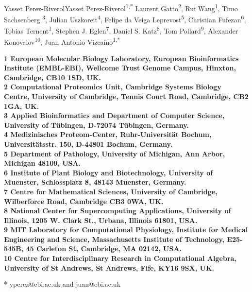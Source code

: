 \documentclass[10pt,letterpaper]{article}
\date{}
\begin{document}
\vspace*{0.35in}

\begin{flushleft}
{\Large
\textbf{}
}
\newline
\\

Yasset Perez-RiverolYasset Perez-Riverol\textsuperscript{1,*}
Laurent Gatto\textsuperscript{2},
Rui Wang\textsuperscript{1}, 
Timo Sachsenberg \textsuperscript{3},
Julian Uszkoreit\textsuperscript{4},
Felipe da Veiga Leprevost\textsuperscript{5},
Christian Fufezan\textsuperscript{6},
Tobias Ternent\textsuperscript{1},
Stephen J. Eglen\textsuperscript{7}, 
Daniel S. Katz\textsuperscript{8}, 
Tom Pollard\textsuperscript{9}, 
Alexander Konovalov\textsuperscript{10},
Juan Antonio Vizcaíno\textsuperscript{1,*}


\bigskip

\bf{1} European Molecular Biology Laboratory, European Bioinformatics
Institute (EMBL-EBI), Wellcome Trust Genome Campus, Hinxton,
Cambridge, CB10 1SD, UK.
\\
\bf{2} Computational Proteomics Unit, Cambridge Systems Biology
Centre, University of Cambridge, Tennis Court Road, Cambridge, CB2
1GA, UK.
\\
\bf{3} Applied Bioinformatics and Department of Computer Science,
University of Tübingen, D-72074 Tübingen, Germany.
\\
\bf{4} Medizinisches Proteom-Center, Ruhr-Universität Bochum,
Universitätsstr. 150, D-44801 Bochum, Germany.
\\
\bf{5} Department of Pathology, University of Michigan, Ann Arbor,
Michigan 48109, USA.
\\
\bf{6} Institute of Plant Biology and Biotechnology, University of
Muenster, Schlossplatz 8, 48143 Muenster, Germany.
\\
\bf{7} Centre for Mathematical Sciences, University of Cambridge,
Wilberforce Road, Cambridge CB3 0WA, UK.
\\
\bf{8} National Center for Supercomputing Applications, University of
Illinois, 1205 W. Clark St., Urbana, Illinois 61801, USA.
\\
\bf{9} MIT Laboratory for Computational Physiology, Institute for
Medical Engineering and Science, Massachusetts Institute of
Technology, E25-545B, 45 Carleton St, Cambridge, MA 02142, USA.
\\
\bf{10} Centre for Interdisciplinary Research in Computational
Algebra, University of St Andrews, St Andrews, Fife, KY16 9SX, UK.
\bigskip

* yperez@ebi.ac.uk and juan@ebi.ac.uk

\end{flushleft}
\end{document}
